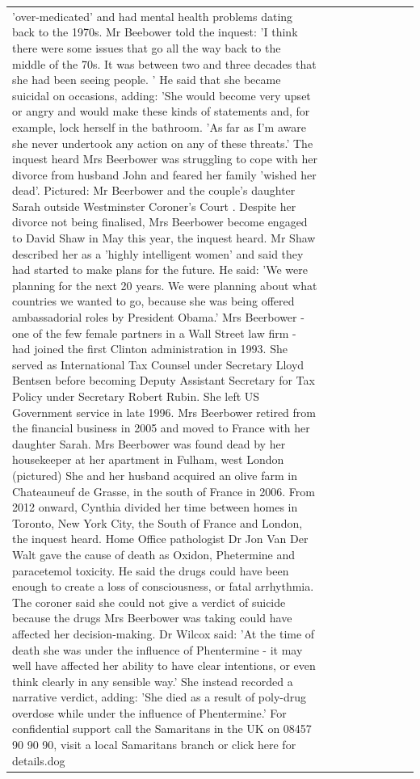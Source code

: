 \begin{table}[H]
\begin{tabular}{lllrlllll}
'over-medicated' and had mental health problems dating back to the 1970s. Mr Beebower told the inquest: 'I think there were some issues that go all the way back to the middle of the 70s. It was between two and three decades that she had been seeing people. ' He said that she became suicidal on occasions, adding: 'She would become very upset or angry and would make these kinds of statements and, for example, lock herself in the bathroom. 'As far as I'm aware she never undertook any action on any of these threats.' The inquest heard Mrs Beerbower was struggling to cope with her divorce from husband John and feared her family 'wished her dead'. Pictured: Mr Beerbower and the couple's daughter Sarah outside Westminster Coroner's Court . Despite her divorce not being finalised, Mrs Beerbower become engaged to David Shaw in May this year, the inquest heard. Mr Shaw described her as a 'highly intelligent women' and said they had started to make plans for the future. He said: 'We were planning for the next 20 years. We were planning about what countries we wanted to go, because she was being offered ambassadorial roles by President Obama.' Mrs Beerbower - one of the few female partners in a Wall Street law firm - had joined the first Clinton administration in 1993. She served as International Tax Counsel under Secretary Lloyd Bentsen before becoming Deputy Assistant Secretary for Tax Policy under Secretary Robert Rubin. She left US Government service in late 1996. Mrs Beerbower retired from the financial business in 2005 and moved to France with her daughter Sarah. Mrs Beerbower was found dead by her housekeeper at her apartment in Fulham, west London (pictured) She and her husband acquired an olive farm in Chateauneuf de Grasse, in the south of France in 2006. From 2012 onward, Cynthia divided her time between homes in Toronto, New York City, the South of France and London, the inquest heard. Home Office pathologist Dr Jon Van Der Walt gave the cause of death as Oxidon, Phetermine and paracetemol toxicity. He said the drugs could have been enough to create a loss of consciousness, or fatal arrhythmia. The coroner said she could not give a verdict of suicide because the drugs Mrs Beerbower was taking could have affected her decision-making. Dr Wilcox said: 'At the time of death she was under the influence of Phentermine - it may well have affected her ability to have clear intentions, or even think clearly in any sensible way.' She instead recorded a narrative verdict, adding: 'She died as a result of poly-drug overdose while under the influence of Phentermine.' For confidential support call the Samaritans in the UK on 08457 90 90 90, visit a local Samaritans branch or click here for details.dog \\

\end{tabular}
\end{table}
